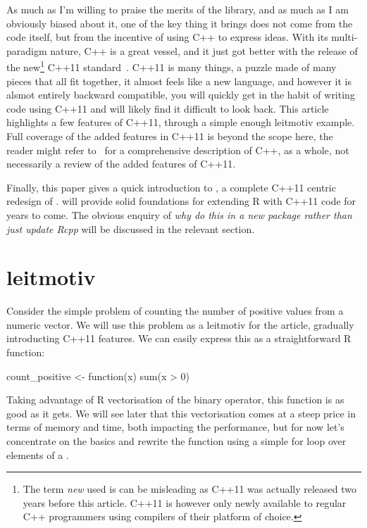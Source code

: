 As much as I'm willing to praise the merits of the  library, and 
as much as I am obviously biased about it, 
one of the key thing it brings does not come from the code itself, but from 
the incentive of using C++ to express ideas. With its multi-paradigm
nature, C++ is a great vessel, and it just got better with the release of the 
new\footnote{The term \emph{new} used is can be misleading as
C++11 was actually released two years before this article. C++11 is however 
only newly available to regular C++ programmers using compilers of their 
platform of choice.} C++11 standard~\citep{Cpp11}. C++11 is many things, a puzzle 
made of many pieces that all fit together, it almost feels like a new language, 
and however it is alsmot entirely backward compatible, you will quickly get in the 
habit of writing code using C++11 and will likely find it difficult to 
look back. This article highlights a few features of C++11, through a simple
enough leitmotiv example. Full coverage of the added features in
C++11 is beyond the scope here, the reader might refer to~\citep{Stroustrup2013}
for a comprehensive description of C++, as a whole, not necessarily a review
of the added features of C++11.

Finally, this paper gives a quick introduction to , 
a complete C++11 centric redesign of .  will 
provide solid foundations for extending R with C++11 code for years to come. 
The obvious enquiry of \emph{why do this in a new package rather than just
update Rcpp} will be discussed in the relevant section. 

\section{leitmotiv}

Consider the simple problem of counting the number of positive values
from a numeric vector. We will use this problem as a leitmotiv for the 
article, gradually introducting C++11 features.  
We can easily express this as a straightforward R function:

\begin{example}
count_positive <- function(x){
  sum(x > 0)
}
\end{example}

Taking advantage of R vectorisation of the \code{>} binary operator, this 
function is as good as it gets. We will see later that this vectorisation 
comes at a steep price in terms of memory and time, both impacting the 
performance, but for now let's concentrate on the basics and 
rewrite the function using a simple for loop over elements of a 
. 

